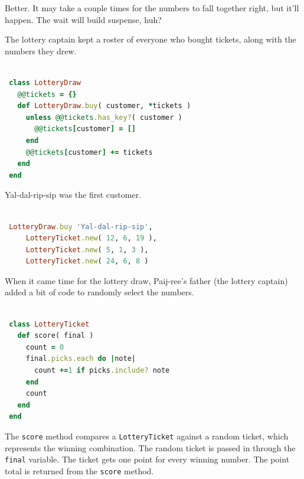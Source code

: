 \documentclass[10pt,twoside]{report}
\begin{document}
Better.  It may take a couple times for the numbers to fall together
right, but it'll happen.  The wait will build suspense, huh?

The lottery captain kept a roster of everyone who bought tickets,
along with the numbers they drew.


\begin{lstlisting}[basicstyle=\ttfamily\color{basiccolor},
    commentstyle = \ttfamily\color{commentcolor},
    keywordstyle=\ttfamily\color{keywordscolor},
    stringstyle=\color{stringcolor},
    language=Ruby,
    basicstyle=\small\ttfamily,
    showstringspaces=false,
  ]

 class LotteryDraw
   @@tickets = {}
   def LotteryDraw.buy( customer, *tickets )
     unless @@tickets.has_key?( customer )
       @@tickets[customer] = []
     end
     @@tickets[customer] += tickets
   end
 end

\end{lstlisting}


Yal-dal-rip-sip was the first customer.


\begin{lstlisting}[basicstyle=\ttfamily\color{basiccolor},
    commentstyle = \ttfamily\color{commentcolor},
    keywordstyle=\ttfamily\color{keywordscolor},
    stringstyle=\color{stringcolor},
    language=Ruby,
    basicstyle=\small\ttfamily,
    showstringspaces=false,
  ]

 LotteryDraw.buy 'Yal-dal-rip-sip',
     LotteryTicket.new( 12, 6, 19 ),
     LotteryTicket.new( 5, 1, 3 ),
     LotteryTicket.new( 24, 6, 8 )

\end{lstlisting}


When it came time for the lottery draw, Paij-ree's father (the lottery
captain) added a bit of code to randomly select the numbers.


\begin{lstlisting}[basicstyle=\ttfamily\color{basiccolor},
    commentstyle = \ttfamily\color{commentcolor},
    keywordstyle=\ttfamily\color{keywordscolor},
    stringstyle=\color{stringcolor},
    language=Ruby,
    basicstyle=\small\ttfamily,
    showstringspaces=false,
  ]

 class LotteryTicket
   def score( final )
     count = 0
     final.picks.each do |note|
       count +=1 if picks.include? note
     end
     count
   end
 end

\end{lstlisting}


The \lstinline[breaklines=true]|score| method compares a
\lstinline[breaklines=true]|LotteryTicket| against a random ticket,
which represents the winning combination.  The random ticket is passed
in through the \lstinline[breaklines=true]|final| variable.  The
ticket gets one point for every winning number.  The point total is
returned from the \lstinline[breaklines=true]|score| method.
\end{document}
